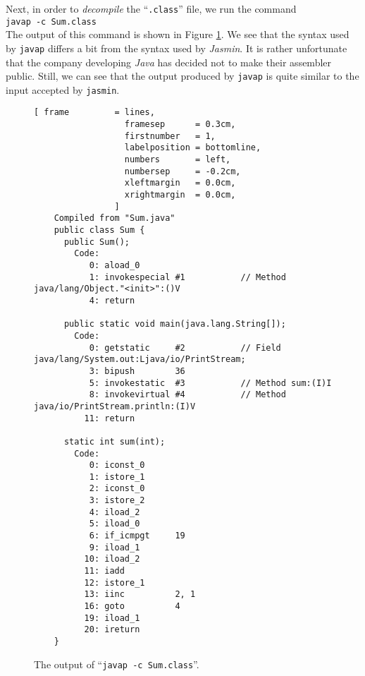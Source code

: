 Next, in order to \emph{decompile} the ``\texttt{.class}'' file, we run the command
\\[0.2cm]
\hspace*{1.3cm}
\texttt{javap -c Sum.class}
\\[0.2cm]
The output of this command is shown in Figure \ref{fig:Sum.class}.  We see that the syntax used by
\texttt{javap} differs a bit from the syntax used by \textsl{Jasmin}.  It is rather unfortunate that
the company developing \textsl{Java} has decided not to make their assembler public.  Still, we can
see that the output produced by \texttt{javap} is quite similar to the input accepted by \texttt{jasmin}.

\begin{figure}[!ht]
\centering
\begin{Verbatim}[ frame         = lines, 
                  framesep      = 0.3cm, 
                  firstnumber   = 1,
                  labelposition = bottomline,
                  numbers       = left,
                  numbersep     = -0.2cm,
                  xleftmargin   = 0.0cm,
                  xrightmargin  = 0.0cm,
                ]
    Compiled from "Sum.java"
    public class Sum {
      public Sum();
        Code:
           0: aload_0       
           1: invokespecial #1           // Method java/lang/Object."<init>":()V
           4: return        
    
      public static void main(java.lang.String[]);
        Code:
           0: getstatic     #2           // Field java/lang/System.out:Ljava/io/PrintStream;
           3: bipush        36
           5: invokestatic  #3           // Method sum:(I)I
           8: invokevirtual #4           // Method java/io/PrintStream.println:(I)V
          11: return        
    
      static int sum(int);
        Code:
           0: iconst_0      
           1: istore_1      
           2: iconst_0      
           3: istore_2      
           4: iload_2       
           5: iload_0       
           6: if_icmpgt     19
           9: iload_1       
          10: iload_2       
          11: iadd          
          12: istore_1      
          13: iinc          2, 1
          16: goto          4
          19: iload_1       
          20: ireturn       
    }
\end{Verbatim}
\vspace*{-0.3cm}
\caption{The output of ``\texttt{javap -c Sum.class}''.}
\label{fig:Sum.class}
\end{figure}


